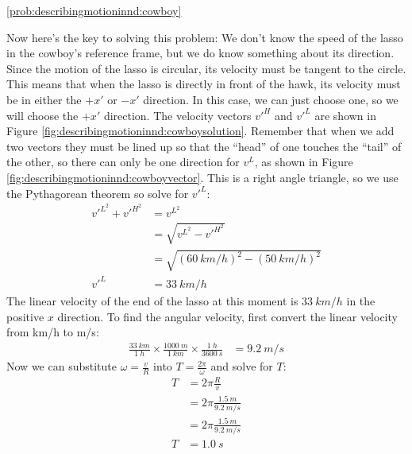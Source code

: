 \begin{solution}{\ref{prob:describingmotioninnd:cowboy}}
{\begin{enumerate}[label=\alph*)]
Now here's the key to solving this problem: We don't know the speed of the lasso in the cowboy's reference frame, but we do know something about its direction. Since the motion of the lasso is circular, its velocity must be tangent to the circle. This means that when the lasso is directly in front of the hawk, its velocity must be in either the $+x'$ or $-x'$ direction. In this case, we can just choose one, so we will choose the $+x'$ direction.
The velocity vectors $v'^H$ and $v'^L$ are shown in Figure \ref{fig:describingmotioninnd:cowboysolution}. Remember that when we add two vectors they must be lined up so that the ``head'' of one touches the ``tail'' of the other, so there can only be one direction for $v^L$, as shown in Figure \ref{fig:describingmotioninnd:cowboyvector}. 
This is a right angle triangle, so we use the Pythagorean theorem so solve for $v'^L$:
\begin{align*}
v'^{L^2}+v'^{H^2}&=v^{L^2}\\
&=\sqrt{v^{L^2}-v'^{H^2}}\\
&=\sqrt{(\SI{60}{km/h})^2-(\SI{50}{km/h})^2}\\
v'^L&=\SI{33}{km/h}
\end{align*}
The linear velocity of the end of the lasso at this moment is $\SI{33}{km/h}$ in the positive $x$ direction.  To find the angular velocity, first convert the linear velocity from km/h to m/s:
\begin{align*}
\frac{\SI{33}{km}}{\SI{1}{h}}\times \frac{\SI{1000}{m}}{\SI{1}{km}} \times \frac{\SI{1}{h}}{\SI{3600}{s}} &= \SI{9.2}{m/s}
\end{align*}     
Now we can substitute $\omega=\frac{v}{R}$ into $T=\frac{2\pi}{\omega}$ and solve for $T$:
\begin{align*}
T&={2\pi}\frac{R}{v}\\
&={2\pi}\frac{\SI{1.5}{m}}{\SI{9.2}{m/s}}\\
&={2\pi}\frac{\SI{1.5}{m}}{\SI{9.2}{m/s}}\\
T&=\SI{1.0}{s}
\end{align*}

\end{enumerate}}
\end{solution}
